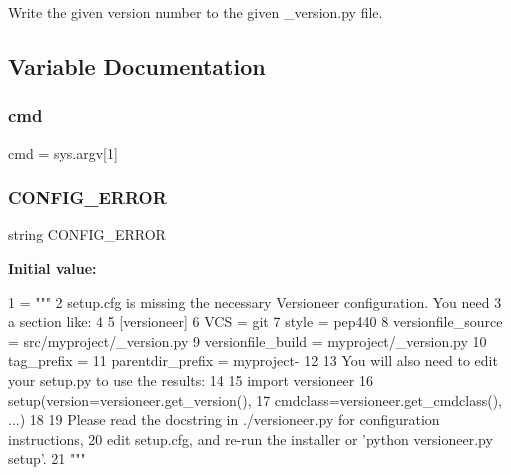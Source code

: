 \begin{DoxyVerb}Write the given version number to the given _version.py file.\end{DoxyVerb}
 

\subsection{Variable Documentation}
\mbox{\label{namespaceversioneer_adfc5ba7e22f5e4a6221c12a70503bef3}} 
\subsubsection{\texorpdfstring{cmd}{cmd}}
{\footnotesize\ttfamily cmd = sys.\+argv\mbox{[}1\mbox{]}}

\mbox{\label{namespaceversioneer_a12952044fe2d0a7c64a8e4d2b51dd66c}} 
\subsubsection{\texorpdfstring{C\+O\+N\+F\+I\+G\+\_\+\+E\+R\+R\+OR}{CONFIG\_ERROR}}
{\footnotesize\ttfamily string C\+O\+N\+F\+I\+G\+\_\+\+E\+R\+R\+OR}

{\bfseries Initial value\+:}
\begin{DoxyCode}
1 =  \textcolor{stringliteral}{"""}
2 \textcolor{stringliteral}{setup.cfg is missing the necessary Versioneer configuration. You need}
3 \textcolor{stringliteral}{a section like:}
4 \textcolor{stringliteral}{}
5 \textcolor{stringliteral}{ [versioneer]}
6 \textcolor{stringliteral}{ VCS = git}
7 \textcolor{stringliteral}{ style = pep440}
8 \textcolor{stringliteral}{ versionfile\_source = src/myproject/\_version.py}
9 \textcolor{stringliteral}{ versionfile\_build = myproject/\_version.py}
10 \textcolor{stringliteral}{ tag\_prefix =}
11 \textcolor{stringliteral}{ parentdir\_prefix = myproject-}
12 \textcolor{stringliteral}{}
13 \textcolor{stringliteral}{You will also need to edit your setup.py to use the results:}
14 \textcolor{stringliteral}{}
15 \textcolor{stringliteral}{ import versioneer}
16 \textcolor{stringliteral}{ setup(version=versioneer.get\_version(),}
17 \textcolor{stringliteral}{       cmdclass=versioneer.get\_cmdclass(), ...)}
18 \textcolor{stringliteral}{}
19 \textcolor{stringliteral}{Please read the docstring in ./versioneer.py for configuration instructions,}
20 \textcolor{stringliteral}{edit setup.cfg, and re-run the installer or 'python versioneer.py setup'.}
21 \textcolor{stringliteral}{"""}
\end{DoxyCode}
\mbox{\label{namespaceversioneer_a392f48c0119ddcef4c443ca399328f8a}} 
